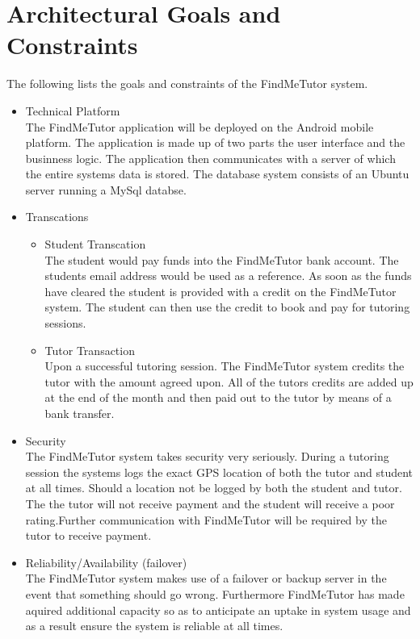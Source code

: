 \documentclass[12pt]{article}
\begin{document}
\section{Architectural Goals and Constraints}
The following lists the goals and constraints of the FindMeTutor system.
\begin{itemize}

\item Technical Platform\\
The FindMeTutor application will be deployed on the Android mobile platform. The application is made up of two parts the user interface and the businness logic. The application then communicates with a server of which the entire systems data is stored. The database system consists of an Ubuntu server running a MySql databse.

\item Transcations
\begin{itemize}

\item Student Transcation\\
The student would pay funds into the FindMeTutor bank account. The students email address would be used as a reference. As soon as the funds have cleared the student is provided with a credit on the FindMeTutor system. The student can then use the credit to book and pay for tutoring sessions.

\item Tutor Transaction\\
Upon a successful tutoring session. The FindMeTutor system credits the tutor with the amount agreed upon. All of the tutors credits are added up at the end of the month and then paid out to the tutor by means of a bank transfer.
\end{itemize}

\item Security\\
The FindMeTutor system takes security very seriously. During a tutoring session the systems logs the exact GPS location of both the tutor and student at all times. Should a location not be logged by both the student and tutor. The the tutor will not receive payment and the student will receive a poor rating.Further communication with FindMeTutor will be required by the tutor to receive payment.

\item Reliability/Availability (failover)\\
The FindMeTutor system makes use of a failover or backup server in the event that something should go wrong. Furthermore FindMeTutor has made aquired additional capacity so as to anticipate an uptake in system usage and as a result ensure the system is reliable at all times.
\end{itemize}
\end{document}
